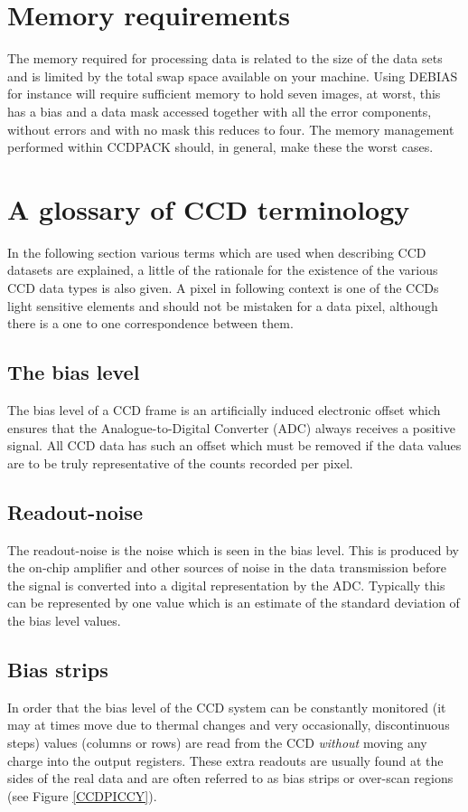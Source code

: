 \documentclass[twoside,11pt]{article}
\newcommand{\htmlref}[2]{#1}
\newcommand{\xlabel}[1]{}
\renewcommand{\_}{\texttt{\symbol{95}}}
\newcommand{\xroutine}[1]{\htmlref{{\sc #1}}{#1}}
\begin{document}
\newpage
\section{Memory requirements}
The memory required for processing data is related to the size of the
data sets and is limited by the total swap space available on your
machine. Using \xroutine{DEBIAS} for instance will require sufficient
memory to hold seven images, at worst, this has a bias and a data mask
accessed together with all the error components, without errors and with
no mask this reduces to four.  The memory management performed within
CCDPACK should, in general, make these the worst cases.

\section{A glossary of CCD terminology \xlabel{glossary} \label{app:glos}}
\label{donothing}
In the following section various terms which are used when describing
CCD datasets are explained, a little of the rationale for the
existence of the various CCD data types is also given. A pixel in
following context is one of the CCDs light sensitive elements and
should not be mistaken for a data pixel, although there is a one to
one correspondence between them.

\subsection{The bias level\xlabel{CCDglosbias}}
The bias level of a CCD frame is an artificially induced electronic offset
which ensures that the Analogue-to-Digital Converter (ADC) always receives a
positive signal. All CCD data has such an offset which must be removed if the
data values are to be truly representative of the counts recorded per pixel.

\subsection{Readout-noise\xlabel{CCDglosreadnoise}}
The readout-noise is the noise which is seen in the bias level. This is produced
by the on-chip amplifier and other sources of noise in the data transmission
before the signal is converted into a digital representation by the ADC.
Typically this can be represented by one value which is an estimate of the
standard deviation of the bias level values.

\subsection{Bias strips\xlabel{CCDglosbiasstrips}}
In order that the bias level of the CCD system can be constantly monitored (it
may at times move due to thermal changes and very occasionally, discontinuous
steps) values (columns or rows) are read from the CCD {\em without} moving any
charge into the output registers. These extra readouts are usually found at the
sides of the real data and are often referred to as bias strips or over-scan
regions (see Figure \ref{CCDPICCY}).
\end{document}
